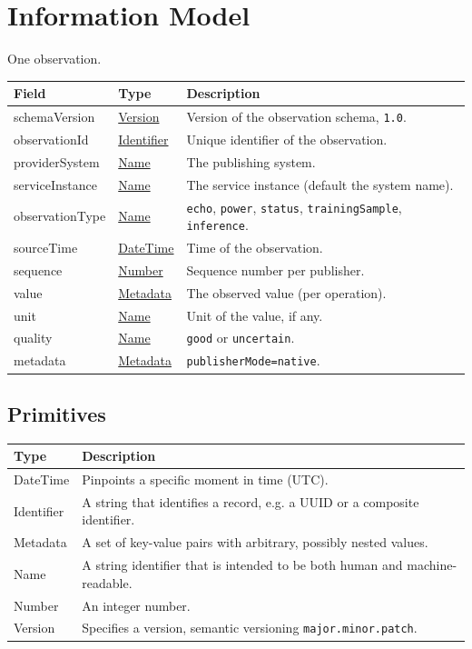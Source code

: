 \documentclass[a4paper]{arrowhead}
\newcommand{\pdef}[1]{{\textcolor{ArrowheadGrey}{#1\label{sec:model:primitives:#1}\label{sec:model:primitives:#1s}\label{sec:model:primitives:#1es}}}}
\newcommand{\pref}[1]{{\textcolor{ArrowheadGrey}{\hyperref[sec:model:primitives:#1]{#1}}}}
\begin{document}
\newpage

\section{Information Model}
\label{sec:model}


One observation.

\noindent\begin{tabularx}{\textwidth}{| p{4.25cm} | p{3.5cm} | X |} \hline
\rowcolor{gray!33} Field & Type & Description \\ \hline
schemaVersion & \pref{Version} & Version of the observation schema, \texttt{1.0}. \\ \hline
observationId & \pref{Identifier} & Unique identifier of the observation. \\ \hline
providerSystem & \pref{Name} & The publishing system. \\ \hline
serviceInstance & \pref{Name} & The service instance (default the system name). \\ \hline
observationType & \pref{Name} & \texttt{echo}, \texttt{power}, \texttt{status}, \texttt{trainingSample}, \texttt{inference}. \\ \hline
sourceTime & \pref{DateTime} & Time of the observation. \\ \hline
sequence & \pref{Number} & Sequence number per publisher. \\ \hline
value & \pref{Metadata} & The observed value (per operation). \\ \hline
unit & \pref{Name} & Unit of the value, if any. \\ \hline
quality & \pref{Name} & \texttt{good} or \texttt{uncertain}. \\ \hline
metadata & \pref{Metadata} & \texttt{publisherMode=native}. \\ \hline
\end{tabularx}

\subsection{Primitives}
\label{sec:model:primitives}

\noindent\begin{tabularx}{\textwidth}{| p{3cm} | X |} \hline
\rowcolor{gray!33} Type & Description \\ \hline
\pdef{DateTime} & Pinpoints a specific moment in time (UTC). \\ \hline
\pdef{Identifier} & A string that identifies a record, e.g. a UUID or a composite identifier. \\ \hline
\pdef{Metadata} & A set of key-value pairs with arbitrary, possibly nested values. \\ \hline
\pdef{Name} & A string identifier that is intended to be both human and machine-readable. \\ \hline
\pdef{Number} & An integer number. \\ \hline
\pdef{Version} & Specifies a version, semantic versioning \texttt{major.minor.patch}. \\ \hline
\end{tabularx}
\end{document}
